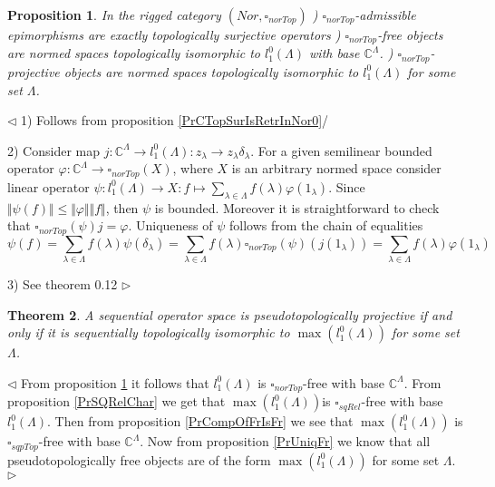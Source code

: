 \documentclass[12pt]{article}
\newtheorem{theorem}{Theorem}[subsection]
\newtheorem{proposition}[theorem]{Proposition}
\newenvironment{proof}{\par $\triangleleft$}{$\triangleright$}
\begin{document}
\begin{proposition}\label{PrNorTopChar}
In the rigged category $(Nor, \square_{norTop})$
) $\square_{norTop}$-admissible epimorphisms are exactly topologically surjective operators
) $\square_{norTop}$-free objects are normed spaces topologically isomorphic to $l_1^0(\Lambda)$ with base $\mathbb{C}^\Lambda$.
) $\square_{norTop}$-projective objects are normed spaces topologically isomorphic to $l_1^0(\Lambda)$ for some set $\Lambda$. 
\end{proposition}
\begin{proof}
1) Follows from proposition \ref{PrCTopSurIsRetrInNor0}/

2) Consider map $j:\mathbb{C}^\Lambda\to l_1^0(\Lambda):z_\lambda\to z_\lambda\delta_\lambda$. For a given semilinear bounded operator $\varphi:\mathbb{C}^\Lambda\to\square_{norTop}(X)$, where $X$ is an arbitrary normed space consider linear operator $\psi:l_1^0(\Lambda)\to X:f\mapsto\sum_{\lambda\in\Lambda}f(\lambda)\varphi(1_\lambda)$. Since $\Vert\psi(f)\Vert\leq\Vert\varphi\Vert\Vert f\Vert$, then $\psi$ is bounded. Moreover it is straightforward to check that $\square_{norTop}(\psi)j=\varphi$. Uniqueness of $\psi$ follows from the chain of equalities 
$$
\psi(f)=\sum_{\lambda\in\Lambda} f(\lambda)\psi(\delta_\lambda)=\sum_{\lambda\in\Lambda} f(\lambda)\square_{norTop}(\psi)(j(1_\lambda))=\sum_{\lambda\in\Lambda} f(\lambda)\varphi(1_\lambda)
$$

3) See \cite{GroTopNorPr} theorem 0.12
\end{proof}

\begin{theorem}\label{ThPsTopFrDesc}
A sequential  operator space is pseudotopologically projective if and only if it is sequentially topologically isomorphic to $\max(l_1^0(\Lambda))$ for some set $\Lambda$.
\end{theorem}
\begin{proof}
From proposition \ref{PrNorTopChar} it follows that $l_1^0(\Lambda)$ is $\square_{norTop}$-free with base  $\mathbb{C}^\Lambda$. From proposition \ref{PrSQRelChar} we get that $\max(l_1^0(\Lambda))$is  $\square_{sqRel}$-free with base $l_1^0(\Lambda)$. Then from proposition \ref{PrCompOfFrIsFr} we see that $\max(l_1^0(\Lambda))$ is $\square_{sqpTop}$-free with base $\mathbb{C}^\Lambda$. Now from proposition \ref{PrUniqFr} we know that all pseudotopologically free objects are of the form $\max(l_1^0(\Lambda))$ for some set $\Lambda$.
\end{proof}
\end{document}
